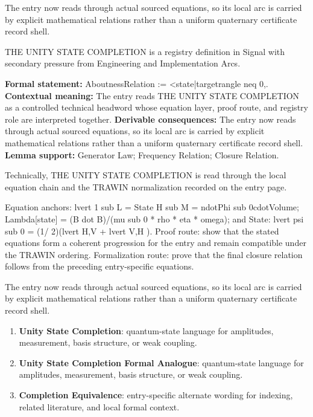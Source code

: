 The entry now reads through actual sourced equations, so its local arc is carried by explicit mathematical relations rather than a uniform quaternary certificate record shell.
\clearpage


\begingroup\small
{}
THE UNITY STATE COMPLETION is a registry definition in Signal with secondary pressure from Engineering and Implementation Arcs.

\begingroup\footnotesize\setlength{\emergencystretch}{3em}\sloppy
\textbf{Formal statement:} AboutnessRelation := <state|targetrangle neq 0,. \textbf{Contextual meaning:} The entry reads THE UNITY STATE COMPLETION as a controlled technical headword whose equation layer, proof route, and registry role are interpreted together. \textbf{Derivable consequences:} The entry now reads through actual sourced equations, so its local arc is carried by explicit mathematical relations rather than a uniform quaternary certificate record shell. \textbf{Lemma support:} Generator Law; Frequency Relation; Closure Relation.\par
\endgroup

Technically, THE UNITY STATE COMPLETION is read through the local equation chain and the TRAWIN normalization recorded on the entry page.

Equation anchors: lvert 1 sub L = State H sub M = ndotPhi sub 0cdotVolume; Lambda[state] = (B dot B)/(mu sub 0 * rho * eta * omega); and State: lvert psi sub 0 = (1/ 2)(lvert H,V + lvert V,H ). Proof route: show that the stated equations form a coherent progression for the entry and remain compatible under the TRAWIN ordering. Formalization route: prove that the final closure relation follows from the preceding entry-specific equations.

The entry now reads through actual sourced equations, so its local arc is carried by explicit mathematical relations rather than a uniform quaternary certificate record shell.
\endgroup

\begin{enumerate}[leftmargin=1.6em,itemsep=6pt,topsep=4pt]
\item \textbf{Unity State Completion}: quantum-state language for amplitudes, measurement, basis structure, or weak coupling.
\item \textbf{Unity State Completion Formal Analogue}: quantum-state language for amplitudes, measurement, basis structure, or weak coupling.
\item \textbf{Completion Equivalence}: entry-specific alternate wording for indexing, related literature, and local formal context.
\end{enumerate}

